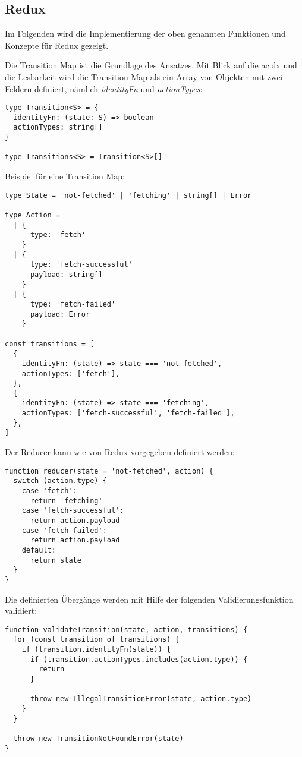 \subsection{Redux}

Im Folgenden wird die Implementierung der oben genannten Funktionen und Konzepte für Redux gezeigt.

Die Transition Map ist die Grundlage des Ansatzes. Mit Blick auf die \acrlong{ac:dx} und die Lesbarkeit wird die Transition Map als ein Array von Objekten mit zwei Feldern definiert, nämlich \textit{identityFn} und \textit{actionTypes}:

\begin{lstlisting}
type Transition<S> = {
  identityFn: (state: S) => boolean
  actionTypes: string[]
}
  
type Transitions<S> = Transition<S>[]
\end{lstlisting}

Beispiel für eine Transition Map:

\begin{lstlisting}
type State = 'not-fetched' | 'fetching' | string[] | Error

type Action =
  | {
      type: 'fetch'
    }
  | {
      type: 'fetch-successful'
      payload: string[]
    }
  | {
      type: 'fetch-failed'
      payload: Error
    }
  
const transitions = [
  {
    identityFn: (state) => state === 'not-fetched',
    actionTypes: ['fetch'],
  },
  {
    identityFn: (state) => state === 'fetching',
    actionTypes: ['fetch-successful', 'fetch-failed'],
  },
]
\end{lstlisting}

Der Reducer kann wie von Redux vorgegeben definiert werden:

\begin{lstlisting}
function reducer(state = 'not-fetched', action) {
  switch (action.type) {
    case 'fetch':
      return 'fetching'
    case 'fetch-successful':
      return action.payload
    case 'fetch-failed':
      return action.payload
    default:
      return state
  }
}
\end{lstlisting}

Die definierten Übergänge werden mit Hilfe der folgenden Validierungsfunktion validiert:

\begin{lstlisting}
function validateTransition(state, action, transitions) {
  for (const transition of transitions) {
    if (transition.identityFn(state)) {
      if (transition.actionTypes.includes(action.type)) {
        return
      }
  
      throw new IllegalTransitionError(state, action.type)
    }
  }
  
  throw new TransitionNotFoundError(state)
}
\end{lstlisting}

